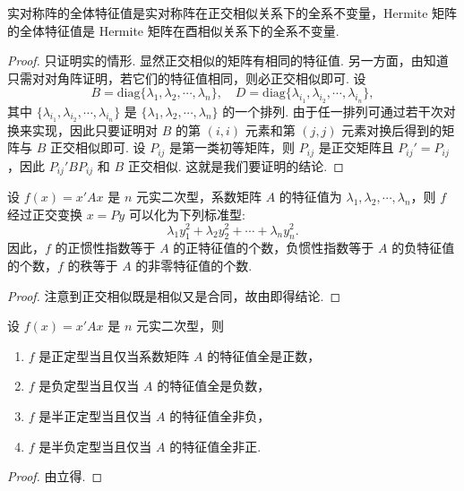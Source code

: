 \documentclass[../../main.tex]{subfiles}
\begin{document}
\begin{corollary}\label{corollary:实对称和Hermite矩阵的全系不变量}
实对称阵的全体特征值是实对称阵在正交相似关系下的全系不变量，Hermite 矩阵的全体特征值是 Hermite 矩阵在酉相似关系下的全系不变量.
\end{corollary}
\begin{proof}
只证明实的情形. 显然正交相似的矩阵有相同的特征值. 另一方面，由知道只需对对角阵证明，若它们的特征值相同，则必正交相似即可. 设
\[
B = \mathrm{diag}\{\lambda_1,\lambda_2,\cdots,\lambda_n\}, \quad D = \mathrm{diag}\{\lambda_{i_1},\lambda_{i_2},\cdots,\lambda_{i_n}\},
\]
其中 $\{\lambda_{i_1},\lambda_{i_2},\cdots,\lambda_{i_n}\}$ 是 $\{\lambda_1,\lambda_2,\cdots,\lambda_n\}$ 的一个排列. 由于任一排列可通过若干次对换来实现，因此只要证明对 $B$ 的第 $(i,i)$ 元素和第 $(j,j)$ 元素对换后得到的矩阵与 $B$ 正交相似即可. 设 $P_{ij}$ 是第一类初等矩阵，则 $P_{ij}$ 是正交矩阵且 $P_{ij}' = P_{ij}$，因此 $P_{ij}'BP_{ij}$ 和 $B$ 正交相似. 这就是我们要证明的结论.

\end{proof}

\begin{theorem}\label{theorem:二次型经正交变换后可化为标准型}
设 $f(x) = x'Ax$ 是 $n$ 元实二次型，系数矩阵 $A$ 的特征值为 $\lambda_1,\lambda_2,\cdots,\lambda_n$，则 $f$ 经过正交变换 $x = Py$ 可以化为下列标准型:
\[
\lambda_1y_1^2 + \lambda_2y_2^2 + \cdots + \lambda_ny_n^2.
\]
因此，$f$ 的正惯性指数等于 $A$ 的正特征值的个数，负惯性指数等于 $A$ 的负特征值的个数，$f$ 的秩等于 $A$ 的非零特征值的个数.
\end{theorem}
\begin{proof}
注意到正交相似既是相似又是合同，故由即得结论. 

\end{proof}

\begin{corollary}\label{corollary:二次型式(半)正定型(负定型)的充要条件}
设 $f(x) = x'Ax$ 是 $n$ 元实二次型，则 
\begin{enumerate}
\item $f$ 是正定型当且仅当系数矩阵 $A$ 的特征值全是正数，

\item $f$ 是负定型当且仅当 $A$ 的特征值全是负数，

\item $f$ 是半正定型当且仅当 $A$ 的特征值全非负，

\item $f$ 是半负定型当且仅当 $A$ 的特征值全非正.
\end{enumerate}
\end{corollary}
\begin{proof}
由立得.

\end{proof}
\end{document}
